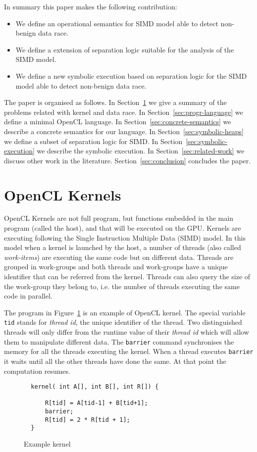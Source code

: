 \documentclass[a4paper,11pt]{llncs}
\begin{document}
In summary this paper makes the following contribution:
\begin{itemize}
\item We define an operational semantics for SIMD model able to detect non-benign data race.
\item We define a extension of separation logic suitable for the analysis of the SIMD model.
\item We define a new symbolic execution based on separation logic for the SIMD model able to detect non-benign data race.
\end{itemize}
The paper is organised as follows.
In Section~\ref{sec:background} we give a summary of the problems related with kernel and data race.
In Section~\ref{sec:progr-language} we define a minimal OpenCL language.
In Section~\ref{sec:concrete-semantics} we describe a concrete semantics for our language.
In Section~\ref{sec:symbolic-heaps} we define a subset of separation logic for SIMD.
In Section~\ref{sec:symbolic-execution} we describe the symbolic execution.
In Section~\ref{sec:related-work} we discuss other work in the literature. 
Section~\ref{sec:conclusion} concludes the paper.

\section{OpenCL Kernels}
\label{sec:background}
OpenCL Kernels are not full program, but functions embedded in the main program (called the host), and that will be executed on the GPU.
Kernels are executing following the Single Instruction Multiple Data (SIMD) model.
In this model when a kernel is launched by the host, a number of threads (also called {\em work-items}) are executing the same code but on different data.
Threads are grouped in work-groups and both threads and work-groups have a unique identifier that can be referred from the kernel. 
Threads can also query the size of the work-group they belong to, i.e. the number of threads executing the same code in parallel.

\begin{example}
The program in Figure~\ref{fig:kernel} is an example of OpenCL kernel. The special variable {\tt tid} stands for {\em thread id}, the unique identifier of the thread.
Two distinguished threads will only differ from the runtime value of their {\em thread id} which will allow them to manipulate different data.
The {\tt barrier} command synchronises the memory for all the threads executing the kernel. When a thread executes {\tt barrier} it waits until all the other threads have done the same. At that point  the computation resumes.
\end{example}\begin{figure}[t]
   \centering
\begin{verbatim}
  kernel( int A[], int B[], int R[]) { 
   
      R[tid] = A[tid-1] + B[tid+1];
      barrier;
      R[tid] = 2 * R[tid + 1];
  }
\end{verbatim}
 \caption{Example kernel}
 \label{fig:kernel}
\end{figure}
\end{document}
